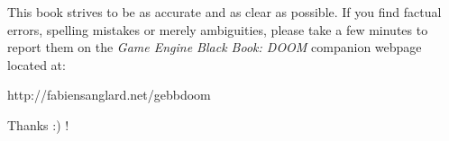 This book strives to be as accurate and as clear as possible. If you find factual errors, spelling mistakes or merely ambiguities, please take a few minutes to report them on the \textit{Game Engine Black Book: DOOM} companion webpage located at:\\
\par
http://fabiensanglard.net/gebbdoom\\
\par
Thanks :) !